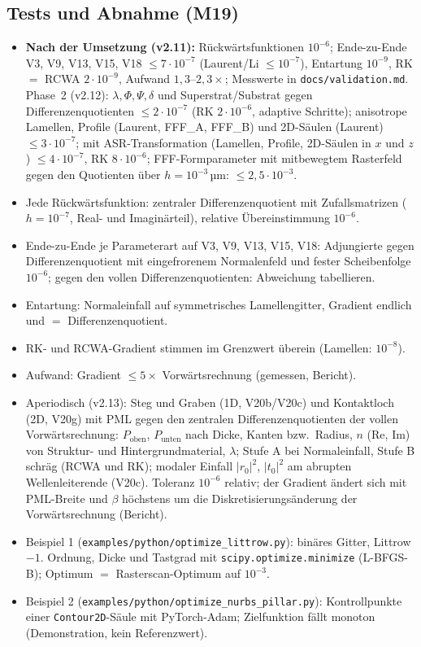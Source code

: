 \subsection{Tests und Abnahme (M19)}
\begin{itemize}[nosep]
  \item \textbf{Nach der Umsetzung (v2.11):} Rückwärtsfunktionen $10^{-6}$; Ende-zu-Ende V3, V9, V13, V15, V18
        $\le7\cdot10^{-7}$ (Laurent/Li $\le10^{-7}$), Entartung $10^{-9}$, RK $=$ RCWA $2\cdot10^{-9}$, Aufwand
        $1{,}3$--$2{,}3\times$; Messwerte in \verb|docs/validation.md|. Phase~2 (v2.12): $\lambda,\Phi,\Psi,\delta$ und
        Superstrat/Substrat gegen Differenzenquotienten $\le2\cdot10^{-7}$ (RK $2\cdot10^{-6}$, adaptive Schritte);
        anisotrope Lamellen, Profile (Laurent, FFF\_A, FFF\_B) und 2D-Säulen (Laurent) $\le3\cdot10^{-7}$;
        mit ASR-Transformation (Lamellen, Profile, 2D-Säulen in $x$ und $z$) $\le4\cdot10^{-7}$, RK $8\cdot10^{-6}$;
        FFF-Formparameter mit mitbewegtem Rasterfeld gegen den Quotienten über $h=10^{-3}$\,µm: $\le2{,}5\cdot10^{-3}$.
  \item Jede Rückwärtsfunktion: zentraler Differenzenquotient mit Zufallsmatrizen ($h=10^{-7}$, Real- und Imaginärteil),
        relative Übereinstimmung $10^{-6}$.
  \item Ende-zu-Ende je Parameterart auf V3, V9, V13, V15, V18: Adjungierte gegen Differenzenquotient mit eingefrorenem
        Normalenfeld und fester Scheibenfolge $10^{-6}$; gegen den vollen Differenzenquotienten: Abweichung tabellieren.
  \item Entartung: Normaleinfall auf symmetrisches Lamellengitter, Gradient endlich und $=$ Differenzenquotient.
  \item RK- und RCWA-Gradient stimmen im Grenzwert überein (Lamellen: $10^{-8}$).
  \item Aufwand: Gradient $\le5\times$ Vorwärtsrechnung (gemessen, Bericht).
  \item Aperiodisch (v2.13): Steg und Graben (1D, V20b/V20c) und Kontaktloch (2D, V20g) mit PML gegen den zentralen
        Differenzenquotienten der vollen Vorwärtsrechnung: $P_{\text{oben}}$, $P_{\text{unten}}$ nach Dicke, Kanten bzw.\
        Radius, $n$ (Re, Im) von Struktur- und Hintergrundmaterial, $\lambda$; Stufe A bei Normaleinfall, Stufe B
        schräg (RCWA und RK); modaler Einfall $|r_0|^2$, $|t_0|^2$ am abrupten Wellenleiterende (V20c). Toleranz $10^{-6}$
        relativ; der Gradient ändert sich mit PML-Breite und $\beta$ höchstens um die Diskretisierungsänderung der
        Vorwärtsrechnung (Bericht).
  \item Beispiel 1 (\verb|examples/python/optimize_littrow.py|): binäres Gitter, Littrow $-1$. Ordnung, Dicke und Tastgrad
        mit \verb|scipy.optimize.minimize| (L-BFGS-B); Optimum $=$ Rasterscan-Optimum auf $10^{-3}$.
  \item Beispiel 2 (\verb|examples/python/optimize_nurbs_pillar.py|): Kontrollpunkte einer \verb|Contour2D|-Säule mit
        PyTorch-Adam; Zielfunktion fällt monoton (Demonstration, kein Referenzwert).
\end{itemize}

